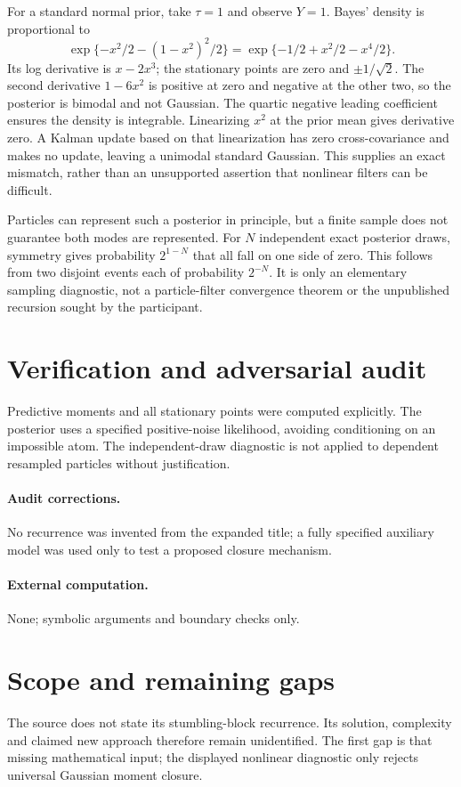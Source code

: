 \documentclass[11pt]{article}
\begin{document}
For a standard normal prior, take $\tau=1$ and observe $Y=1$. Bayes' density is
proportional to
\[
 \exp\{-x^2/2-(1-x^2)^2/2\}
 =\exp\{-1/2+x^2/2-x^4/2\}.
\]
Its log derivative is $x-2x^3$; the stationary points are zero and
$\pm1/\sqrt2$. The second derivative $1-6x^2$ is positive at zero and
negative at the other two, so the posterior is bimodal and not Gaussian.
The quartic negative leading coefficient ensures the density is integrable.
Linearizing $x^2$ at the prior mean gives derivative zero. A Kalman update
based on that linearization has zero cross-covariance and makes no update,
leaving a unimodal standard Gaussian. This supplies an exact mismatch, rather
than an unsupported assertion that nonlinear filters can be difficult.

Particles can represent such a posterior in principle, but a finite sample
does not guarantee both modes are represented. For $N$ independent exact
posterior draws, symmetry gives probability $2^{1-N}$ that all fall on one
side of zero. This follows from two disjoint events each of probability $2^{-N}$.
It is only an elementary sampling diagnostic, not a particle-filter convergence
theorem or the unpublished recursion sought by the participant.
\section{Verification and adversarial audit}
Predictive moments and all stationary points were computed explicitly.
The posterior uses a specified positive-noise likelihood, avoiding conditioning
on an impossible atom. The independent-draw diagnostic is not applied to
dependent resampled particles without justification.
\paragraph{Audit corrections.} No recurrence was invented from the expanded title; a fully specified auxiliary model was used only to test a proposed closure mechanism.
\paragraph{External computation.} None; symbolic arguments and boundary checks only.
\section{Scope and remaining gaps}
The source does not state its stumbling-block recurrence. Its solution,
complexity and claimed new approach therefore remain unidentified. The first
gap is that missing mathematical input; the displayed nonlinear diagnostic
only rejects universal Gaussian moment closure.
\end{document}
